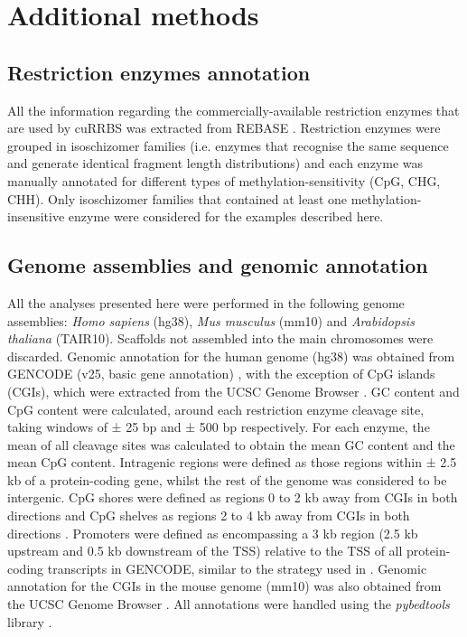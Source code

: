 \smallskip

\section{Additional methods} \label{s:4.7}

\subsection*{Restriction enzymes annotation}

All the information regarding the commercially-available restriction enzymes that are used by cuRRBS was extracted from REBASE \citep{Roberts2005,Roberts2015}. Restriction enzymes were grouped in isoschizomer families (i.e. enzymes that recognise the same sequence and generate identical fragment length distributions) and each enzyme was manually annotated for different types of methylation-sensitivity (CpG, CHG, \acrshort{CHH}). Only isoschizomer families that contained at least one methylation-insensitive enzyme were considered for the examples described here.

\subsection*{Genome assemblies and genomic annotation}

All the analyses presented here were performed in the following genome assemblies: \textit{Homo sapiens} (hg38), \textit{Mus musculus} (mm10) and \textit{Arabidopsis thaliana} (TAIR10). Scaffolds not assembled into the main chromosomes were discarded. Genomic annotation for the human genome (hg38) was obtained from GENCODE (v25, basic gene annotation) \citep{Harrow2012}, with the exception of CpG islands (CGIs), which were extracted from the UCSC Genome Browser \citep{Bock2007}. GC content and CpG content were calculated, around each restriction enzyme cleavage site, taking windows of  ± 25 bp and ± 500 bp respectively. For each enzyme, the mean of all cleavage sites was calculated to obtain the mean GC content and the mean CpG content. Intragenic regions were defined as those regions within ± 2.5 \acrshort{kb} of a protein-coding gene, whilst the rest of the genome was considered to be intergenic. CpG shores were defined as regions 0 to 2 kb away from CGIs in both directions and CpG shelves as regions 2 to 4 kb away from CGIs in both directions \citep{Zhang2015}. Promoters were defined as encompassing a 3 kb region (2.5 kb upstream and 0.5 kb downstream of the  \acrshort{TSS}) relative to the TSS of all protein-coding transcripts in GENCODE, similar to the strategy used in \citet{Taher2013}. Genomic annotation for the CGIs in the mouse genome (mm10) was also obtained from the UCSC Genome Browser \citep{Bock2007}. All annotations were handled using the \textit{pybedtools} library \citep{Quinlan2011,Quinlan2010}.

